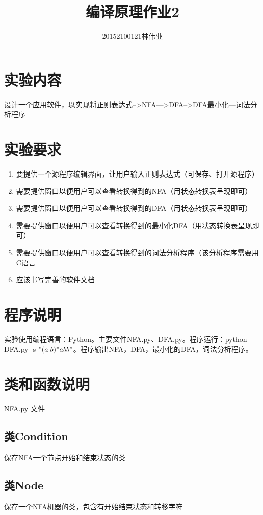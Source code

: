 \documentclass[]{article}
\title{编译原理作业2}
\author{20152100121林伟业}
\date{}
\begin{document}
\maketitle

\section{实验内容}

设计一个应用软件，以实现将正则表达式-->NFA--->DFA-->DFA最小化---词法分析程序

\section{实验要求}

\begin{enumerate}
\item   要提供一个源程序编辑界面，让用户输入正则表达式（可保存、打开源程序）
\item   需要提供窗口以便用户可以查看转换得到的NFA（用状态转换表呈现即可）
\item   需要提供窗口以便用户可以查看转换得到的DFA（用状态转换表呈现即可）
\item   需要提供窗口以便用户可以查看转换得到的最小化DFA（用状态转换表呈现即可）
\item   需要提供窗口以便用户可以查看转换得到的词法分析程序（该分析程序需要用C语言
\item   应该书写完善的软件文档
\end{enumerate}

\section{程序说明}

实验使用编程语言：Python。主要文件NFA.py、DFA.py。程序运行：python DFA.py -s $"(a|b)^*abb"$。程序输出NFA，DFA，最小化的DFA，词法分析程序。

\section{类和函数说明}
NFA.py 文件
\subsection{类Condition}
保存NFA一个节点开始和结束状态的类

\subsection{类Node}
保存一个NFA机器的类，包含有开始结束状态和转移字符
\end{document}
